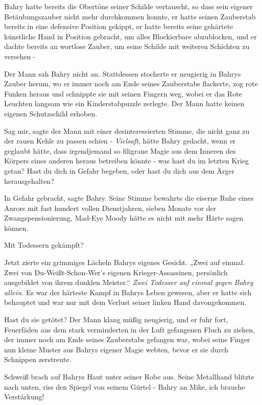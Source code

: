 Bahry hatte bereits die Obertöne seiner Schilde vertauscht, so dass sein eigener
Betäubungszauber nicht mehr durchkommen konnte, er hatte seinen Zauberstab
bereits in eine defensive Position gekippt, er hatte bereits seine gehärtete
künstliche Hand in Position gebracht, um alles Blockierbare abzublocken, und er
dachte bereits an wortlose Zauber, um seine Schilde mit weiteren Schichten zu
versehen -

Der Mann sah Bahry nicht an. Stattdessen stocherte er neugierig in Bahrys Zauber
herum, wo er immer noch am Ende seines Zauberstabs flackerte, zog rote Funken
heraus und schnippte sie mit seinen Fingern weg, wobei er das Rote Leuchten
langsam wie ein Kinderstabpuzzle zerlegte. Der Mann hatte keinen eigenen
Schutzschild erhoben.

\glqq{}Sag mir\grqq{}, sagte der Mann mit einer desinteressierten Stimme, die
nicht ganz zu der rauen Kehle zu passen schien - \emph{Vielsaft}, hätte Bahry
gedacht, wenn er geglaubt hätte, dass irgendjemand so filigrane Magie aus dem
Inneren des Körpers eines anderen heraus betreiben könnte - \glqq{}was hast du im
letzten Krieg getan? Hast du dich in Gefahr begeben, oder hast du dich aus dem
Ärger herausgehalten?\grqq{}

\glqq{}In Gefahr gebracht\grqq{}, sagte Bahry. Seine Stimme bewahrte die eiserne
Ruhe eines Aurors mit fast hundert vollen Dienstjahren, sieben Monate vor der
Zwangspensionierung, Mad-Eye Moody hätte es nicht mit mehr Härte sagen können.

\glqq{}Mit Todessern gekämpft?\grqq{}

Jetzt zierte ein grimmiges Lächeln Bahrys eigenes Gesicht. „Zwei auf einmal.
Zwei von Du-Weißt-Schon-Wer's eigenen Krieger-Assassinen, persönlich ausgebildet
von ihrem dunklen Meister.“
\emph{Zwei Todesser auf einmal gegen Bahry allein.}
Es war der härteste Kampf in Bahrys Leben gewesen, aber er hatte sich behauptet
und war nur mit dem Verlust seiner linken Hand davongekommen.

\glqq{}Hast du sie getötet?\grqq{} Der Mann klang müßig neugierig, und er fuhr
fort, Feuerfäden aus dem stark verminderten in der Luft gefangenen Fluch zu
ziehen, der immer noch am Ende seines Zauberstabs gefangen war, wobei seine
Finger nun kleine Muster aus Bahrys eigener Magie webten, bevor er sie durch
Schnippen zerstreute.

Schweiß brach auf Bahrys Haut unter seiner Robe aus. Seine Metallhand blitzte
nach unten, riss den Spiegel von seinem Gürtel - \glqq{}Bahry an Mike, ich
brauche Verstärkung!\grqq{}

